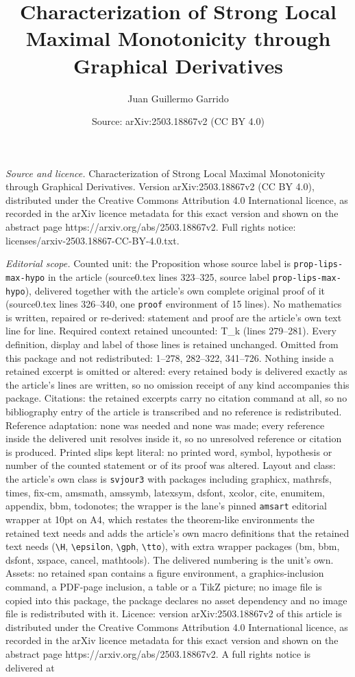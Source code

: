 \documentclass[10pt,a4paper]{amsart}
\title[Characterization of Strong Local Maximal Monotonicity throug]{Characterization of Strong Local Maximal Monotonicity through Graphical Derivatives}
\author{Juan Guillermo Garrido}
\date{Source: arXiv:2503.18867v2 (CC BY 4.0)}
\begin{document}
\maketitle

\noindent\emph{Source and licence.} Characterization of Strong Local Maximal Monotonicity through Graphical Derivatives. Version arXiv:2503.18867v2 (CC BY 4.0), distributed under the Creative Commons Attribution 4.0 International licence, as recorded in the arXiv licence metadata for this exact version and shown on the abstract page https://arxiv.org/abs/2503.18867v2. Full rights notice: licenses/arxiv-2503.18867-CC-BY-4.0.txt.\par\smallskip

\noindent\textit{Editorial scope.} Counted unit: the Proposition whose source label is \texttt{prop-lips-max-hypo} in the article (source0.tex lines 323--325, source label \texttt{prop-lips-max-hypo}), delivered together with the article's own complete original proof of it (source0.tex lines 326--340, one \texttt{proof} environment of 15 lines). No mathematics is written, repaired or re-derived: statement and proof are the article's own text line for line. Required context retained uncounted: T\_k (lines 279--281). Every definition, display and label of those lines is retained unchanged. Omitted from this package and not redistributed: 1--278, 282--322, 341--726. Nothing inside a retained excerpt is omitted or altered: every retained body is delivered exactly as the article's lines are written, so no omission receipt of any kind accompanies this package. Citations: the retained excerpts carry no citation command at all, so no bibliography entry of the article is transcribed and no reference is redistributed. Reference adaptation: none was needed and none was made; every reference inside the delivered unit resolves inside it, so no unresolved reference or citation is produced. Printed slips kept literal: no printed word, symbol, hypothesis or number of the counted statement or of its proof was altered. Layout and class: the article's own class is \texttt{svjour3} with packages including graphicx, mathrsfs, times, fix-cm, amsmath, amssymb, latexsym, dsfont, xcolor, cite, enumitem, appendix, bbm, todonotes; the wrapper is the lane's pinned \texttt{amsart} editorial wrapper at 10pt on A4, which restates the theorem-like environments the retained text needs and adds the article's own macro definitions that the retained text needs (\texttt{\textbackslash H}, \texttt{\textbackslash epsilon}, \texttt{\textbackslash gph}, \texttt{\textbackslash tto}), with extra wrapper packages (bm, bbm, dsfont, xspace, cancel, mathtools). The delivered numbering is the unit's own. Assets: no retained span contains a figure environment, a graphics-inclusion command, a PDF-page inclusion, a table or a TikZ picture; no image file is copied into this package, the package declares no asset dependency and no image file is redistributed with it. Licence: version arXiv:2503.18867v2 of this article is distributed under the Creative Commons Attribution 4.0 International licence, as recorded in the arXiv licence metadata for this exact version and shown on the abstract page https://arxiv.org/abs/2503.18867v2. A full rights notice is delivered at 
\end{document}
